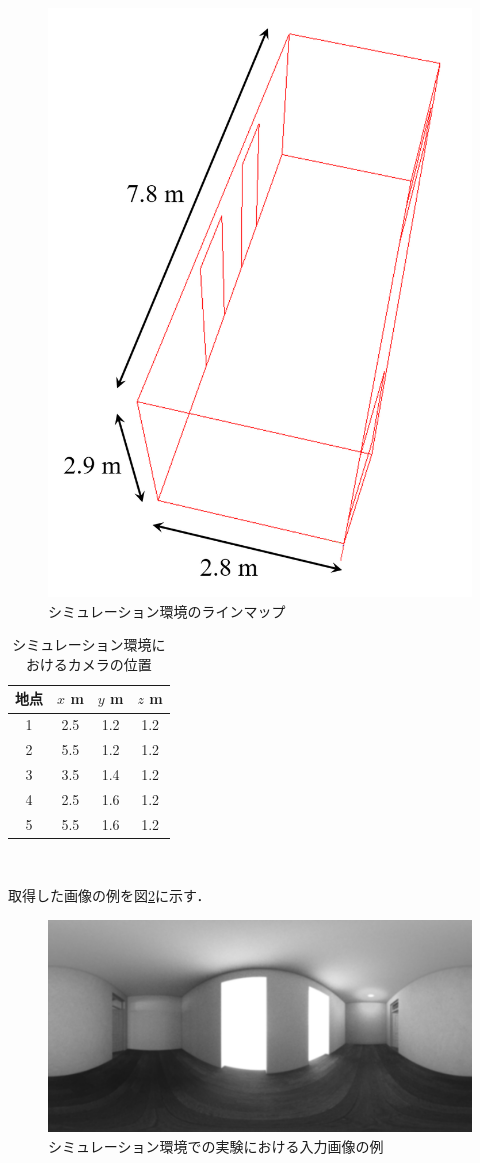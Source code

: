 \begin{figure}[tb]
 \begin{center}
 \includegraphics[width=0.5\columnwidth]{./chap5/fig/linemap.png}
 \caption{シミュレーション環境のラインマップ}
 \label{fig:env_line}
 \end{center}
 \vspace{-5mm}
\end{figure}

\begin{table}[htb]
 \begin{center}
 \caption{シミュレーション環境におけるカメラの位置}
  \begin{tabular}{c||c|c|c} \hline
    地点 & $x$ m & $y$ m & $z$ m \\ \hline \hline
     1 & 2.5 & 1.2 & 1.2  \\ 
     2 & 5.5 & 1.2 & 1.2  \\ 
     3 & 3.5 & 1.4 & 1.2  \\
     4 & 2.5 & 1.6 & 1.2  \\
     5 & 5.5 & 1.6 & 1.2  \\ \hline
  \end{tabular}
　\label{tab:simu_pos}
 \end{center}
\end{table}

取得した画像の例を図\ref{fig:input_simu}に示す．

\begin{figure}[tb]
 \begin{center}
 \includegraphics[width=0.7\columnwidth]{./chap5/fig/blurred_image.png}
 \caption{シミュレーション環境での実験における入力画像の例}
 \label{fig:input_simu}
 \end{center}
 \vspace{-5mm}
\end{figure}


